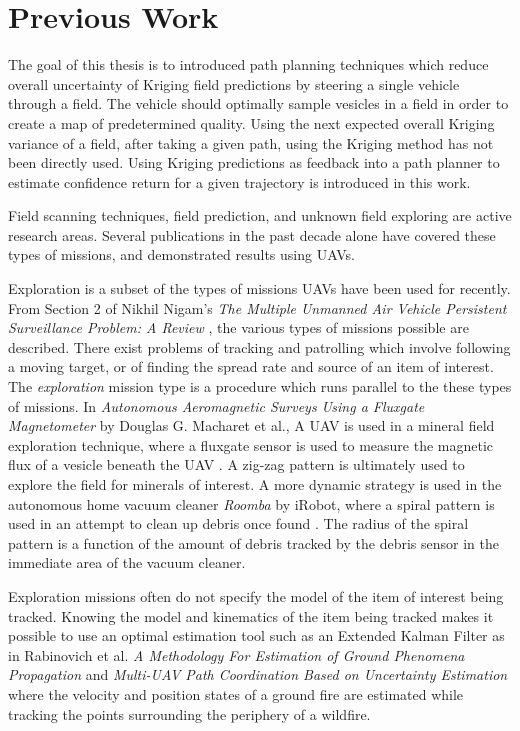 \section{Previous Work}
The goal of this thesis is to introduced path planning techniques which reduce overall uncertainty of Kriging field predictions by steering a single vehicle through a field. The vehicle should optimally sample vesicles in a field in order to create a map of predetermined quality. Using the next expected overall Kriging variance of a field, after taking a given path, using the Kriging method has not been directly used. Using Kriging predictions as feedback into a path planner to estimate confidence return for a given trajectory is introduced in this work.

Field scanning techniques, field prediction, and unknown field exploring are active research areas. Several publications in the past decade alone have covered these types of missions, and demonstrated results using UAVs.

Exploration is a subset of the types of missions UAVs have been used for recently. From Section 2 of Nikhil Nigam's \textit{The Multiple Unmanned Air Vehicle Persistent Surveillance Problem: A Review} \cite{nigam:missions}, the various types of missions possible are described. There exist problems of tracking and patrolling which involve following a moving target, or of finding the spread rate and source of an item of interest. The \textit{exploration} mission type is a procedure which runs parallel to the these types of missions. In \textit{Autonomous Aeromagnetic Surveys Using a Fluxgate Magnetometer} by Douglas G. Macharet et al., A UAV is used in a mineral field exploration technique, where a fluxgate sensor is used to measure the magnetic flux of a vesicle beneath the UAV \cite{macharet:magnet}. A zig-zag pattern is ultimately used to explore the field for minerals of interest. A more dynamic strategy is used in the autonomous home vacuum cleaner \textit{Roomba} by iRobot, where a spiral pattern is used in an attempt to clean up debris once found \cite{roomba:spiral}. The radius of the spiral pattern is a function of the amount of debris tracked by the debris sensor in the immediate area of the vacuum cleaner.

Exploration missions often do not specify the model of the item of interest being tracked. Knowing the model and kinematics of the item being tracked makes it possible to use an optimal estimation tool such as an Extended Kalman Filter as in Rabinovich et al. \textit{A Methodology For Estimation of Ground Phenomena Propagation} \cite{sharon:uav_est} and \textit{Multi-UAV Path Coordination Based on Uncertainty Estimation} \cite{sharon:uav_uncert} where the velocity and position states of a ground fire are estimated while tracking the points surrounding the periphery of a wildfire.

